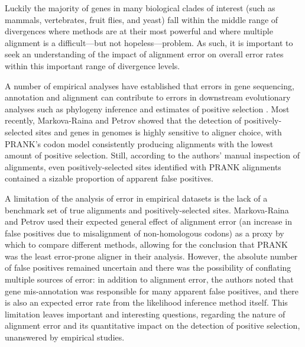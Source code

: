 \documentclass{article}
\begin{document}
Luckily the majority of genes in many biological clades of interest
(such as mammals, vertebrates, fruit flies, and yeast) fall within the
middle range of divergences where \sw methods are at their most
powerful and where multiple alignment is a difficult---but not
hopeless---problem. As such, it is important to seek an understanding
of the impact of alignment error on overall error rates within this
important range of divergence levels.

A number of empirical analyses have established that errors in gene
sequencing, annotation and alignment can contribute to errors in
downstream evolutionary analyses such as phylogeny inference
\citep{Wong2008Alignment} and estimates of positive selection
\citep{Schneider2009Estimates,Markova-Raina2011High}. Most recently,
Markova-Raina and Petrov \citeyearpar{Markova-Raina2011High} showed
that the detection of positively-selected sites and genes in \Dr
genomes is highly sensitive to aligner choice, with PRANK's codon
model \citep{Loytynoja2008PhylogenyAware} consistently producing
alignments with the lowest amount of positive selection. Still,
according to the authors' manual inspection of alignments, even
positively-selected sites identified with PRANK alignments contained a
sizable proportion of apparent false positives.

A limitation of the analysis of error in empirical datasets is the
lack of a benchmark set of true alignments and positively-selected
sites. Markova-Raina and Petrov \citeyearpar{Markova-Raina2011High}
used their expected general effect of alignment error (an increase in
false positives due to misalignment of non-homologous codons) as a
proxy by which to compare different methods, allowing for the
conclusion that PRANK was the least error-prone aligner in their
analysis. However, the absolute number of false positives remained
uncertain and there was the possibility of conflating multiple sources
of error: in addition to alignment error, the authors noted that gene
mis-annotation was responsible for many apparent false positives, and
there is also an expected error rate from the likelihood inference
method itself. This limitation leaves important and interesting
questions, regarding the nature of alignment error and its
quantitative impact on the detection of positive selection, unanswered
by empirical studies.
\end{document}
